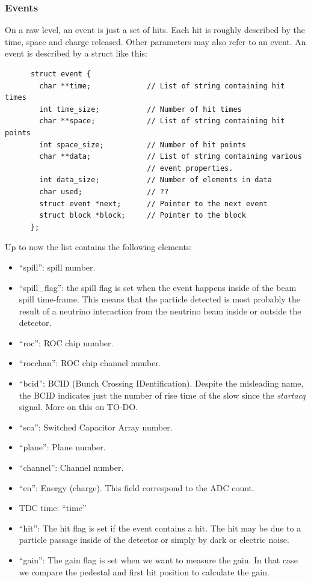 \subsubsection{Events}
On a raw level, an event is just a set of hits. Each hit is roughly described by
the time, space and charge released. Other parameters may also refer to an
event. An event is described by a struct like this:
\begin{lstlisting}
      struct event {
        char **time;             // List of string containing hit times
        int time_size;           // Number of hit times
        char **space;            // List of string containing hit points
        int space_size;          // Number of hit points
        char **data;             // List of string containing various
                                 // event properties.
        int data_size;           // Number of elements in data
        char used;               // ??
        struct event *next;      // Pointer to the next event
        struct block *block;     // Pointer to the block
      };
\end{lstlisting}
Up to now the  list contains the following elements:
\begin{itemize}
\item ``spill'': spill number.
\item ``spill\_flag'': the spill flag is set when the event happens inside of
  the beam spill time-frame. This means that the particle detected is most
  probably the result of a neutrino interaction from the neutrino beam inside or
  outside the detector.
\item ``roc'': ROC chip number.
\item ``rocchan'': ROC chip channel number.
\item ``bcid'': BCID (Bunch Crossing IDentification). Despite the misleading
  name, the BCID indicates just the number of rise time of the slow since the
  \textit{startacq} signal. More on this on TO-DO.\@
\item ``sca'': Switched Capacitor Array number.
\item ``plane'': Plane number.
\item ``channel'': Channel number.
\item ``en'': Energy (charge). This field correspond to the ADC count.
\item TDC time: ``time''
\item ``hit'': The hit flag is set if the event contains a hit. The hit may be
  due to a particle passage inside of the detector or simply by dark or electric
  noise.
\item ``gain'': The gain flag is set when we want to measure the gain. In that
  case we compare the pedestal and first hit position to calculate the gain.
\end{itemize}

